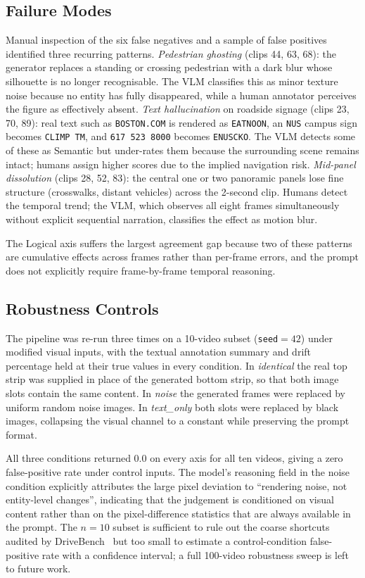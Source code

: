 \documentclass[letterpaper]{article}
\begin{document}
\subsection{Failure Modes}
Manual inspection of the six false negatives and a sample of false
positives identified three recurring patterns. \emph{Pedestrian
ghosting} (clips 44, 63, 68): the generator replaces a standing or
crossing pedestrian with a dark blur whose silhouette is no longer
recognisable. The VLM classifies this as minor texture noise because
no entity has fully disappeared, while a human annotator perceives
the figure as effectively absent. \emph{Text hallucination} on
roadside signage (clips 23, 70, 89): real text such as
\texttt{BOSTON.COM} is rendered as \texttt{EATNOON}, an \texttt{NUS}
campus sign becomes \texttt{CLIMP TM}, and \texttt{617 523 8000}
becomes \texttt{ENUSCKO}. The VLM detects some of these as Semantic
but under-rates them because the surrounding scene remains intact;
humans assign higher scores due to the implied navigation risk.
\emph{Mid-panel dissolution} (clips 28, 52, 83): the central one or
two panoramic panels lose fine structure (crosswalks, distant
vehicles) across the 2-second clip. Humans detect the temporal
trend; the VLM, which observes all eight frames simultaneously
without explicit sequential narration, classifies the effect as
motion blur.

The Logical axis suffers the largest agreement gap because two of
these patterns are cumulative effects across frames rather than
per-frame errors, and the prompt does not explicitly require frame-by-frame
temporal reasoning.

\subsection{Robustness Controls}
The pipeline was re-run three times on a 10-video subset
(\texttt{seed}$=\!42$) under modified visual inputs, with the textual
annotation summary and drift percentage held at their true values in
every condition. In \emph{identical} the real top strip was supplied
in place of the generated bottom strip, so that both image slots
contain the same content. In \emph{noise} the generated frames were
replaced by uniform random noise images. In \emph{text\_only} both
slots were replaced by black images, collapsing the visual channel to
a constant while preserving the prompt format.

All three conditions returned $0.0$ on every axis for all ten videos,
giving a zero false-positive rate under control inputs. The model's
reasoning field in the noise condition explicitly attributes the
large pixel deviation to ``rendering noise, not entity-level
changes'', indicating that the judgement is conditioned on visual
content rather than on the pixel-difference statistics that are
always available in the prompt. The $n\!=\!10$ subset is sufficient
to rule out the coarse shortcuts audited by
DriveBench~\citep{xie2024drivebench} but too small to estimate a
control-condition false-positive rate with a confidence interval; a
full 100-video robustness sweep is left to future work.
\end{document}
